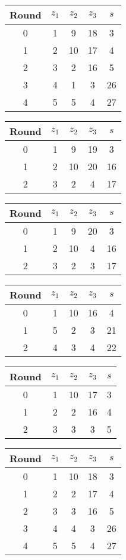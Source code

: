 \begin{multicols}{2}
\begin{tabular}{c | c | c | c | c }
Round & $z_1$ & $z_2$ & $z_3$ & $s$ \\
\hline
0 & 1 & 9 & 18 & 3 \\
1 & 2 & 10 & 17 & 4 \\
2 & 3 & 2 & 16 & 5 \\
3 & 4 & 1 & 3 & 26 \\
4 & 5 & 5 & 4 & 27
\end{tabular}


\begin{tabular}{c | c | c | c | c }
Round & $z_1$ & $z_2$ & $z_3$ & $s$ \\
\hline
0 & 1 & 9 & 19 & 3 \\
1 & 2 & 10 & 20 & 16 \\
2 & 3 & 2 & 4 & 17
\end{tabular}


\begin{tabular}{c | c | c | c | c }
Round & $z_1$ & $z_2$ & $z_3$ & $s$ \\
\hline
0 & 1 & 9 & 20 & 3 \\
1 & 2 & 10 & 4 & 16 \\
2 & 3 & 2 & 3 & 17
\end{tabular}


\begin{tabular}{c | c | c | c | c }
Round & $z_1$ & $z_2$ & $z_3$ & $s$ \\
\hline
0 & 1 & 10 & 16 & 4 \\
1 & 5 & 2 & 3 & 21 \\
2 & 4 & 3 & 4 & 22
\end{tabular}


\begin{tabular}{c | c | c | c | c }
Round & $z_1$ & $z_2$ & $z_3$ & $s$ \\
\hline
0 & 1 & 10 & 17 & 3 \\
1 & 2 & 2 & 16 & 4 \\
2 & 3 & 3 & 3 & 5
\end{tabular}


\begin{tabular}{c | c | c | c | c }
Round & $z_1$ & $z_2$ & $z_3$ & $s$ \\
\hline
0 & 1 & 10 & 18 & 3 \\
1 & 2 & 2 & 17 & 4 \\
2 & 3 & 3 & 16 & 5 \\
3 & 4 & 4 & 3 & 26 \\
4 & 5 & 5 & 4 & 27
\end{tabular}



\end{multicols}
